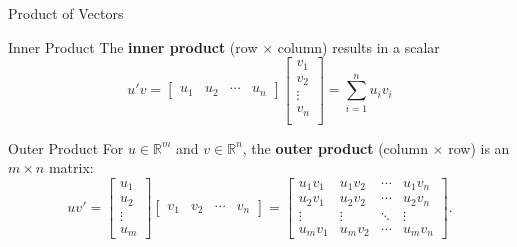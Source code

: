 \documentclass[10pt]{beamer}
\begin{document}
\begin{frame}{Product of Vectors}    

\begin{block}{Inner Product}
The \textbf{inner product} (row $\times$ column) results in a scalar 
$$
    u'v =  \begin{bmatrix} u_1 & u_2 & \cdots & u_n \end{bmatrix}
    \begin{bmatrix} v_{1}  \\
                v_{2}  \\
                \vdots  \\
                v_{n}  \\
     \end{bmatrix} = 
     \sum\limits_{i=1}^{n} u_i v_i
$$
\end{block}

\begin{block}{Outer Product}
For $u\in\mathbb{R}^m$ and $v\in\mathbb{R}^n$, the
\textbf{outer product} (column $\times$ row) is an
$m\times n$ matrix:
\[
uv'=
\begin{bmatrix}
    u_1\\u_2\\\vdots\\u_m
\end{bmatrix}
\begin{bmatrix}
    v_1 & v_2 & \cdots & v_n
\end{bmatrix}
=
\begin{bmatrix}
    u_1v_1 & u_1v_2 & \cdots & u_1v_n\\
    u_2v_1 & u_2v_2 & \cdots & u_2v_n\\
    \vdots & \vdots & \ddots & \vdots\\
    u_mv_1 & u_mv_2 & \cdots & u_mv_n
\end{bmatrix}.
\]
\end{block}
\end{frame}
\end{document}
